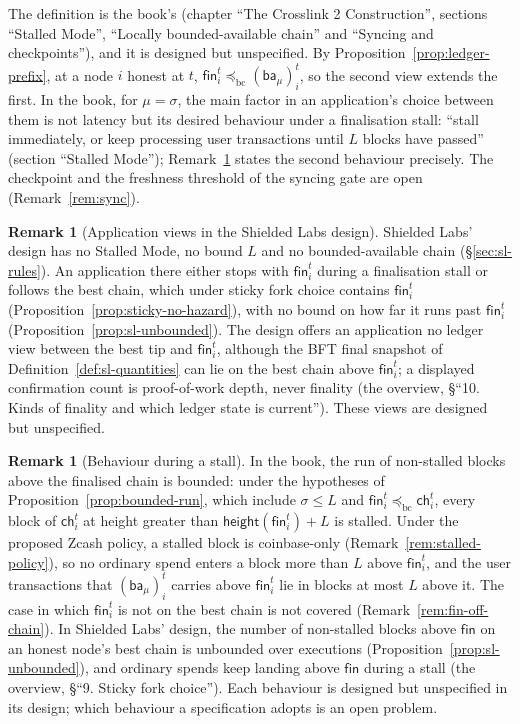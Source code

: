 \documentclass[11pt,a4paper]{article}
\theoremstyle{definition}
\newtheorem{remark}[theorem]{Remark}
\newcommand{\bc}{\mathrm{bc}}
\newcommand{\preceqbc}{\preceq_{\bc}}
\newcommand{\ch}{\mathsf{ch}}
\newcommand{\fin}{\mathsf{fin}}
\newcommand{\ba}{\mathsf{ba}}
\begin{document}
The definition is the book's (chapter ``The Crosslink 2 Construction'',
sections ``Stalled Mode'', ``Locally bounded-available chain'' and
``Syncing and checkpoints''), and it is designed but unspecified. By
Proposition~\ref{prop:ledger-prefix}, at a node $i$ honest at $t$,
$\fin_i^t \preceqbc (\ba_\mu)_i^t$, so the second view extends the first. In
the book, for $\mu = \sigma$, the main factor in an application's choice
between them is not latency but its desired behaviour under a finalisation
stall: ``stall immediately, or keep processing user transactions until $L$
blocks have passed'' (section ``Stalled Mode'');
Remark~\ref{rem:stall-behaviour} states the second behaviour precisely. The
checkpoint and the freshness threshold of the syncing gate are open
(Remark~\ref{rem:sync}).

\begin{remark}[Application views in the Shielded Labs design]%
\label{rem:sl-views}
Shielded Labs' design has no Stalled Mode, no bound $L$ and no
bounded-available chain (\S\ref{sec:sl-rules}). An application there either
stops with $\fin_i^t$ during a finalisation stall or follows the best chain,
which under sticky fork choice contains $\fin_i^t$
(Proposition~\ref{prop:sticky-no-hazard}), with no bound on how far it runs
past $\fin_i^t$ (Proposition~\ref{prop:sl-unbounded}). The design offers an
application no ledger view between the best tip and $\fin_i^t$, although the
BFT final snapshot of Definition~\ref{def:sl-quantities} can lie on the best
chain above $\fin_i^t$; a displayed confirmation count is proof-of-work depth,
never finality (the overview, \S``10. Kinds of finality and which ledger state
is current''). These views are designed but unspecified.
\end{remark}

\begin{remark}[Behaviour during a stall]\label{rem:stall-behaviour}
In the book, the run of non-stalled blocks above the finalised chain is
bounded: under the hypotheses of Proposition~\ref{prop:bounded-run}, which
include $\sigma \le L$ and $\fin_i^t \preceqbc \ch_i^t$, every block of
$\ch_i^t$ at height greater than $\mathsf{height}(\fin_i^t) + L$ is stalled.
Under the proposed Zcash policy, a stalled block is coinbase-only
(Remark~\ref{rem:stalled-policy}), so no ordinary spend enters a block more
than $L$ above $\fin_i^t$, and the user transactions that $(\ba_\mu)_i^t$
carries above $\fin_i^t$ lie in blocks at most $L$ above it. The case in
which $\fin_i^t$ is not on the best chain is not covered
(Remark~\ref{rem:fin-off-chain}). In Shielded Labs' design, the number of
non-stalled blocks above $\fin$ on an honest node's best chain is unbounded
over executions (Proposition~\ref{prop:sl-unbounded}), and ordinary spends
keep landing above $\fin$ during a stall (the overview, \S``9. Sticky fork
choice''). Each behaviour is designed but unspecified in its design; which
behaviour a specification adopts is an open problem.
\end{remark}
\end{document}

